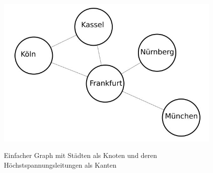 \begin{figure}[t]
	\centering
	{\includegraphics[scale=0.5]{bilder/einfachergraph}\label{fig_einfachergraph}
	}\\
	\caption[Einfacher Graph mit Städten als Knoten und deren Höchstspannungsleitungen als Kanten]{Einfacher Graph mit Städten als Knoten und deren Höchstspannungsleitungen als Kanten}
	\label{fig_einfachergraph}
\end{figure}


